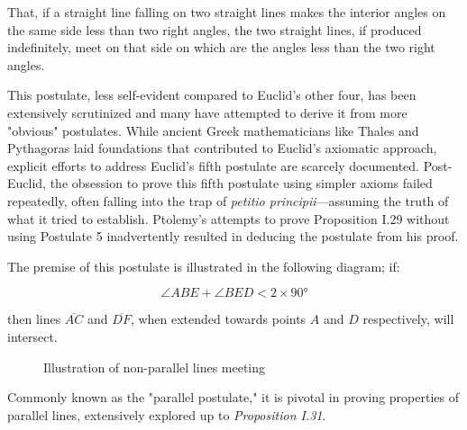 \begin{post}
That, if a straight line falling on two straight lines makes the interior angles on the same side less than two right angles, the two straight lines, if produced indefinitely, meet on that side on which are the angles less than the two right angles.
\end{post}

This postulate, less self-evident compared to Euclid's other four, has been extensively scrutinized and many have attempted to derive it from more "obvious" postulates. While ancient Greek mathematicians like Thales and Pythagoras laid foundations that contributed to Euclid’s axiomatic approach, explicit efforts to address Euclid's fifth postulate are scarcely documented. Post-Euclid, the obsession to prove this fifth postulate using simpler axioms failed repeatedly, often falling into the trap of \textit{petitio principii}—assuming the truth of what it tried to establish. Ptolemy's attempts to prove Proposition I.29 without using Postulate 5 inadvertently resulted in deducing the postulate from his proof.

The premise of this postulate is illustrated in the following diagram; if:

\[ \angle{ABE} + \angle{BED} < 2\times\ang{90}\] 

then lines $\overline{AC}$ and $\overline{DF}$, when extended towards points $A$ and $D$ respectively, will intersect.

\begin{figure}[h]
\centering
	\caption{Illustration of non-parallel lines meeting}
\end{figure}

\clearpage

Commonly known as the "parallel postulate," it is pivotal in proving properties of parallel lines, extensively explored up to \textit{Proposition I.31}.

